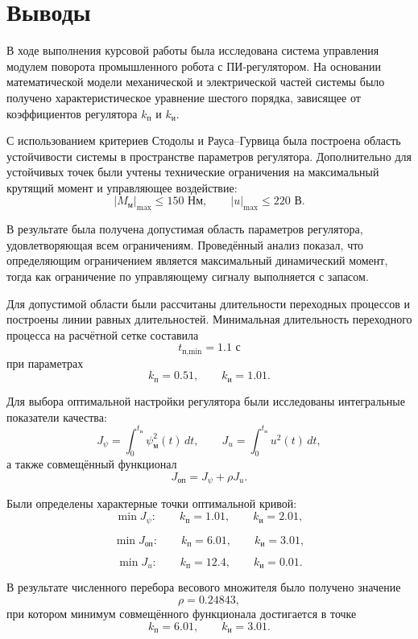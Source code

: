 \section*{Выводы}

В ходе выполнения курсовой работы была исследована система управления модулем поворота промышленного робота с ПИ-регулятором. На основании математической модели механической и электрической частей системы было получено характеристическое уравнение шестого порядка, зависящее от коэффициентов регулятора \(k_{\text{п}}\) и \(k_{\text{и}}\).

С использованием критериев Стодолы и Рауса--Гурвица была построена область устойчивости системы в пространстве параметров регулятора. Дополнительно для устойчивых точек были учтены технические ограничения на максимальный крутящий момент и управляющее воздействие:
\[
|M_{\text{м}}|_{\max} \le 150 \text{ Нм},
\qquad
|u|_{\max} \le 220 \text{ В}.
\]

В результате была получена допустимая область параметров регулятора, удовлетворяющая всем ограничениям. Проведённый анализ показал, что определяющим ограничением является максимальный динамический момент, тогда как ограничение по управляющему сигналу выполняется с запасом.

Для допустимой области были рассчитаны длительности переходных процессов и построены линии равных длительностей. Минимальная длительность переходного процесса на расчётной сетке составила
\[
t_{\text{п,min}} = 1.1 \text{ с}
\]
при параметрах
\[
k_{\text{п}} = 0.51,
\qquad
k_{\text{и}} = 1.01.
\]

Для выбора оптимальной настройки регулятора были исследованы интегральные показатели качества:
\[
J_{\psi}
=
\int_0^{t_{\text{п}}}
\psi_{\text{м}}^2(t)\,dt,
\qquad
J_u
=
\int_0^{t_{\text{п}}}
u^2(t)\,dt,
\]
а также совмещённый функционал
\[
J_{\text{оп}}
=
J_{\psi}
+
\rho J_u.
\]

Были определены характерные точки оптимальной кривой:
\[
\min J_{\psi}:
\qquad
k_{\text{п}} = 1.01,
\qquad
k_{\text{и}} = 2.01,
\]

\[
\min J_{\text{оп}}:
\qquad
k_{\text{п}} = 6.01,
\qquad
k_{\text{и}} = 3.01,
\]

\[
\min J_u:
\qquad
k_{\text{п}} = 12.4,
\qquad
k_{\text{и}} = 0.01.
\]

В результате численного перебора весового множителя было получено значение
\[
\rho = 0.24843,
\]
при котором минимум совмещённого функционала достигается в точке
\[
k_{\text{п}} = 6.01,
\qquad
k_{\text{и}} = 3.01.
\]

